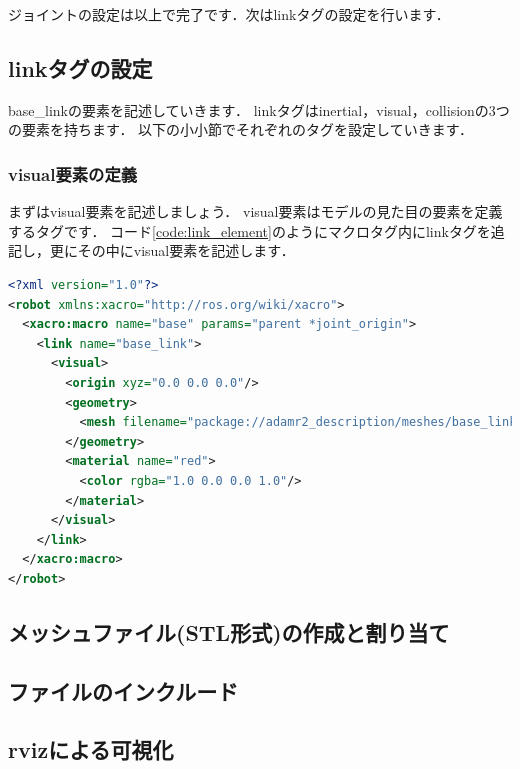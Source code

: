 \documentclass[{../../master}]{subfiles}
\begin{document}
ジョイントの設定は以上で完了です．次は\textsf{link}タグの設定を行います．

\subsection{\textsf{link}タグの設定}
\label{sec:base_link_define_link_tag}

\textsf{base\_link}の要素を記述していきます．
\textsf{link}タグは\textsf{inertial}，\textsf{visual}，\textsf{collision}の3つの要素を持ちます．
以下の小小節でそれぞれのタグを設定していきます．

\subsubsection{\textsf{visual}要素の定義}

まずは\textsf{visual}要素を記述しましょう．
\textsf{visual}要素はモデルの見た目の要素を定義するタグです．
コード\ref{code:link_element}のようにマクロタグ内に\textsf{link}タグを追記し，更にその中に\textsf{visual}要素を記述します．

\begin{lstlisting}[language=XML, caption=\textsf{link} Element, label=code:link_element]
<?xml version="1.0"?>
<robot xmlns:xacro="http://ros.org/wiki/xacro">
  <xacro:macro name="base" params="parent *joint_origin">
    <link name="base_link">
      <visual>
        <origin xyz="0.0 0.0 0.0"/>
        <geometry>
          <mesh filename="package://adamr2_description/meshes/base_link.STL"/>
        </geometry>
        <material name="red">
          <color rgba="1.0 0.0 0.0 1.0"/>
        </material>
      </visual>
    </link>
  </xacro:macro>
</robot>
\end{lstlisting}

\subsection{メッシュファイル(STL形式)の作成と割り当て}



\subsection{ファイルのインクルード}
\label{sec:base_link_include}

\subsection{\textsf{rviz}による可視化}
\end{document}

